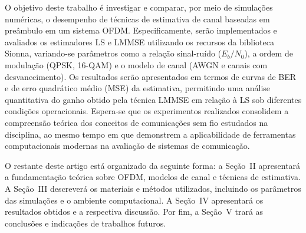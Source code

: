 \documentclass[conference]{IEEEtran}
\begin{document}
O objetivo deste trabalho é investigar e comparar, por meio de simulações numéricas, o desempenho de técnicas de estimativa de canal baseadas em preâmbulo em um sistema OFDM. Especificamente, serão implementados e avaliados os estimadores LS e LMMSE utilizando os recursos da biblioteca Sionna, variando-se parâmetros como a relação sinal-ruído ($E_b/N_0$), a ordem de modulação (QPSK, 16-QAM) e o modelo de canal (AWGN e canais com desvanecimento). Os resultados serão apresentados em termos de curvas de BER e de erro quadrático médio (MSE) da estimativa, permitindo uma análise quantitativa do ganho obtido pela técnica LMMSE em relação à LS sob diferentes condições operacionais. Espera-se que os experimentos realizados consolidem a compreensão teórica dos conceitos de comunicações sem fio estudados na disciplina, ao mesmo tempo em que demonstrem a aplicabilidade de ferramentas computacionais modernas na avaliação de sistemas de comunicação.

O restante deste artigo está organizado da seguinte forma: a Seção~II apresentará a fundamentação teórica sobre OFDM, modelos de canal e técnicas de estimativa. A Seção~III descreverá os materiais e métodos utilizados, incluindo os parâmetros das simulações e o ambiente computacional. A Seção~IV apresentará os resultados obtidos e a respectiva discussão. Por fim, a Seção~V trará as conclusões e indicações de trabalhos futuros.




\end{document}
